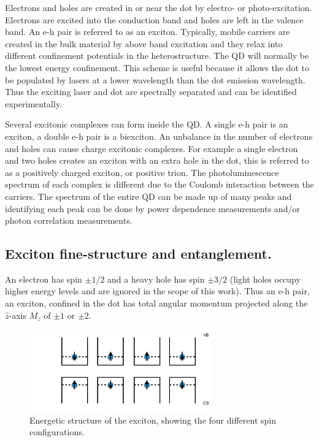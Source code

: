 \documentclass[12pt, twoside]{article}
\numberwithin{equation}{section}
\begin{document}
Electrons and holes are created in or near the dot by electro- or
photo-excitation. Electrons are excited into the conduction band and
holes are left in the valence band. An e-h pair is referred to as an
exciton. Typically, mobile carriers are created in the bulk material by
above band excitation and they relax into different confinement
potentials in the heterostructure. The QD will normally be the lowest
energy confinement. This scheme is useful because it allows the dot to
be populated by lasers at a lower wavelength than the dot emission
wavelength. Thus the exciting laser and dot are spectrally separated and
can be identified experimentally.

Several excitonic complexes can form inside the QD. A single e-h pair is
an exciton, a double e-h pair is a biexciton. An unbalance in the number
of electrons and holes can cause charge excitonic complexes. For example
a single electron and two holes creates an exciton with an extra hole in
the dot, this is referred to as a positively charged exciton, or
positive trion. The photoluminescence spectrum of each complex is
different due to the Coulomb interaction between the carriers. The
spectrum of the entire QD can be made up of many peaks and identifying
each peak can be done by power dependence measurements and/or photon
correlation measurements.

\subsection{Exciton fine-structure and
entanglement.}\label{exciton-fine-structure-and-entanglement.}

An electron has spin $\pm 1/2$ and a heavy hole has spin $\pm 3/2$
(light holes occupy higher energy levels and are ignored in the scope of
this work). Thus an e-h pair, an exciton, confined in the dot has total
angular momentum projected along the $\hat{z}$-axis $M_z$ of $\pm 1$ or
$\pm 2$.

\begin{figure}[h!]
    \centering
    \includegraphics[width=0.7\textwidth]{images/exciton.png}
    \caption{Energetic structure of the exciton, showing the four different spin configurations.}
    \label{fig:exciton}
\end{figure}
\end{document}
